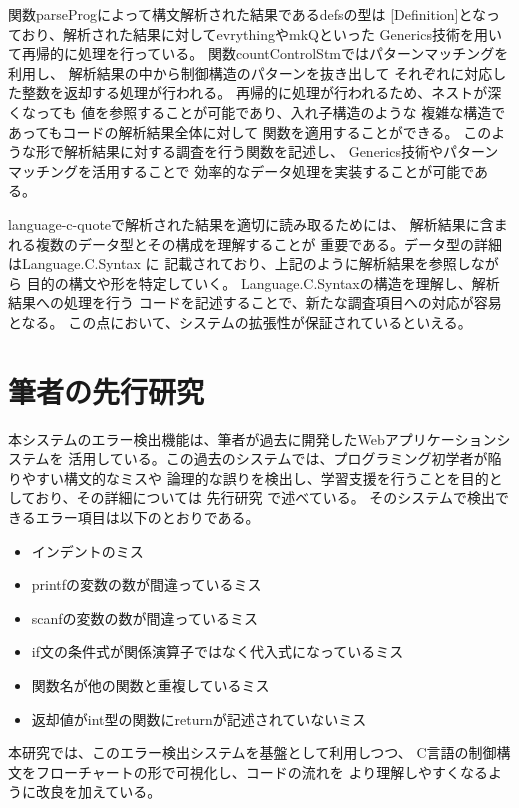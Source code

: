 \documentclass{cssspaper}
\begin{document}
        関数parseProgによって構文解析された結果であるdefsの型は
        [Definition]となっており、解析された結果に対してevrythingやmkQといった
        Generics技術を用いて再帰的に処理を行っている。
        関数countControlStmではパターンマッチングを利用し、
        解析結果の中から制御構造のパターンを抜き出して
        それぞれに対応した整数を返却する処理が行われる。
        再帰的に処理が行われるため、ネストが深くなっても
        値を参照することが可能であり、入れ子構造のような
        複雑な構造であってもコードの解析結果全体に対して
        関数を適用することができる。
        このような形で解析結果に対する調査を行う関数を記述し、
        Generics技術やパターンマッチングを活用することで
        効率的なデータ処理を実装することが可能である。

        language-c-quoteで解析された結果を適切に読み取るためには、
        解析結果に含まれる複数のデータ型とその構成を理解することが
        重要である。データ型の詳細はLanguage.C.Syntax \cite{17}に
        記載されており、上記のように解析結果を参照しながら
        目的の構文や形を特定していく。
        Language.C.Syntaxの構造を理解し、解析結果への処理を行う
        コードを記述することで、新たな調査項目への対応が容易となる。
        この点において、システムの拡張性が保証されているといえる。

        \section{筆者の先行研究}
        本システムのエラー検出機能は、筆者が過去に開発したWebアプリケーションシステムを
        活用している。この過去のシステムでは、プログラミング初学者が陥りやすい構文的なミスや
        論理的な誤りを検出し、学習支援を行うことを目的としており、その詳細については
        先行研究 \cite{18}で述べている。
        そのシステムで検出できるエラー項目は以下のとおりである。
        \begin{itemize}
            \item インデントのミス
            \item printfの変数の数が間違っているミス
            \item scanfの変数の数が間違っているミス
            \item if文の条件式が関係演算子ではなく代入式になっているミス
            \item 関数名が他の関数と重複しているミス
            \item 返却値がint型の関数にreturnが記述されていないミス
        \end{itemize}
        本研究では、このエラー検出システムを基盤として利用しつつ、
        C言語の制御構文をフローチャートの形で可視化し、コードの流れを
        より理解しやすくなるように改良を加えている。
\end{document}

